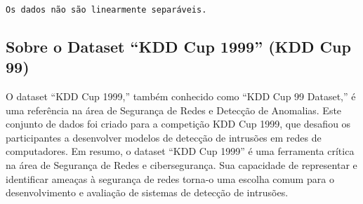 \documentclass[11pt]{article}
\begin{document}
    \begin{center}
    \end{center}
    { \hspace*{\fill} \\}
    
    \begin{center}
    \end{center}
    { \hspace*{\fill} \\}
    
    \begin{center}
    \end{center}
    { \hspace*{\fill} \\}
    
    \begin{Verbatim}[commandchars=\\\{\}]
Os dados não são linearmente separáveis.
    \end{Verbatim}

    \hypertarget{sobre-o-dataset-kdd-cup-1999-kdd-cup-99}{%
\subsection{Sobre o Dataset ``KDD Cup 1999'' (KDD Cup
99)}\label{sobre-o-dataset-kdd-cup-1999-kdd-cup-99}}

O dataset ``KDD Cup 1999,'' também conhecido como ``KDD Cup 99
Dataset,'' é uma referência na área de Segurança de Redes e Detecção de
Anomalias. Este conjunto de dados foi criado para a competição KDD Cup
1999, que desafiou os participantes a desenvolver modelos de detecção de
intrusões em redes de computadores. Em resumo, o dataset ``KDD Cup
1999'' é uma ferramenta crítica na área de Segurança de Redes e
cibersegurança. Sua capacidade de representar e identificar ameaças à
segurança de redes torna-o uma escolha comum para o desenvolvimento e
avaliação de sistemas de detecção de intrusões.
\end{document}
